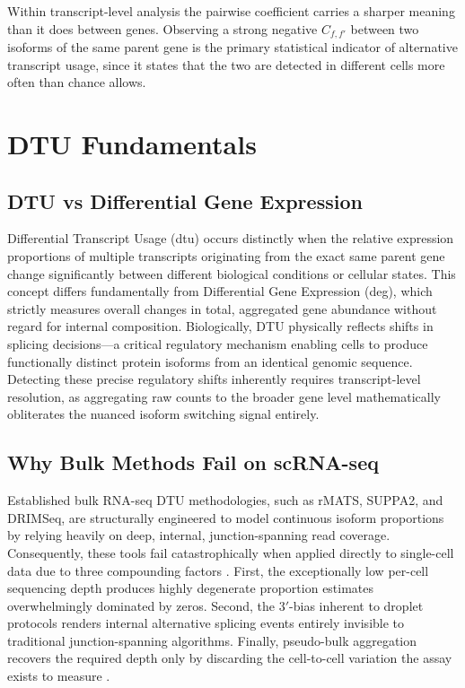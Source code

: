 Within transcript-level analysis the pairwise coefficient carries a sharper meaning than it does between genes. Observing a strong negative $C_{f,f'}$ between two isoforms of the same parent gene is the primary statistical indicator of alternative transcript usage, since it states that the two are detected in different cells more often than chance allows.

\section{DTU Fundamentals}

\subsection{DTU vs Differential Gene Expression}

Differential Transcript Usage (\gls{dtu}) occurs distinctly when the relative expression proportions of multiple transcripts originating from the exact same parent gene change significantly between different biological conditions or cellular states. This concept differs fundamentally from Differential Gene Expression (\gls{deg}), which strictly measures overall changes in total, aggregated gene abundance without regard for internal composition. Biologically, DTU physically reflects shifts in \gls{splicing} decisions---a critical regulatory mechanism enabling cells to produce functionally distinct protein isoforms from an identical genomic sequence. Detecting these precise regulatory shifts inherently requires transcript-level resolution, as aggregating raw counts to the broader gene level mathematically obliterates the nuanced isoform switching signal entirely.

\subsection{Why Bulk Methods Fail on scRNA-seq}

Established bulk RNA-seq DTU methodologies, such as rMATS, SUPPA2, and DRIMSeq, are structurally engineered to model continuous isoform proportions by relying heavily on deep, internal, junction-spanning read coverage. Consequently, these tools fail catastrophically when applied directly to single-cell data due to three compounding factors \cite{galfre2021cotan, love2018swimming}. First, the exceptionally low per-cell sequencing depth produces highly degenerate proportion estimates overwhelmingly dominated by zeros. Second, the $3'$-bias inherent to droplet protocols renders internal alternative splicing events entirely invisible to traditional junction-spanning algorithms. Finally, pseudo-bulk aggregation recovers the required depth only by discarding the cell-to-cell variation the assay exists to measure \cite{gilis2021satuRn, tekath2021dturtle}.

